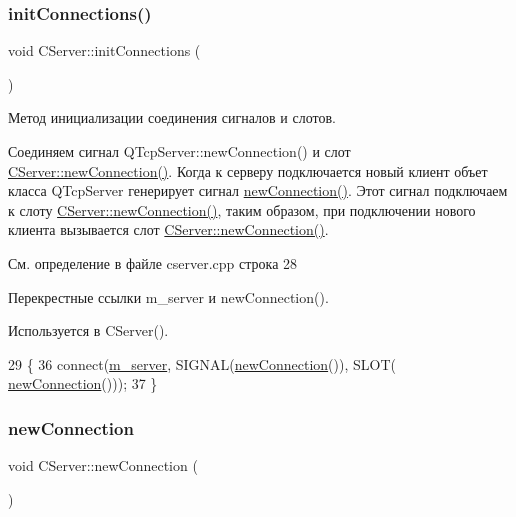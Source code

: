 \subsubsection{\texorpdfstring{init\+Connections()}{initConnections()}}
{\footnotesize\ttfamily void C\+Server\+::init\+Connections (\begin{DoxyParamCaption}{ }\end{DoxyParamCaption})}



Метод инициализации соединения сигналов и слотов. 

Соединяем сигнал Q\+Tcp\+Server\+::new\+Connection() и слот \hyperlink{class_c_server_a4e5b127e1eb4342a130018d9ff921735}{C\+Server\+::new\+Connection()}. Когда к серверу подключается новый клиент объет класса Q\+Tcp\+Server генерирует сигнал \hyperlink{class_c_server_a4e5b127e1eb4342a130018d9ff921735}{new\+Connection()}. Этот сигнал подключаем к слоту \hyperlink{class_c_server_a4e5b127e1eb4342a130018d9ff921735}{C\+Server\+::new\+Connection()}, таким образом, при подключении нового клиента вызывается слот \hyperlink{class_c_server_a4e5b127e1eb4342a130018d9ff921735}{C\+Server\+::new\+Connection()}.

См. определение в файле cserver.\+cpp строка 28



Перекрестные ссылки m\+\_\+server и new\+Connection().



Используется в C\+Server().


\begin{DoxyCode}
29 \{
36     connect(\hyperlink{class_c_server_a0ee5b734ddfc86fc181e767700f7a46b}{m\_server}, SIGNAL(\hyperlink{class_c_server_a4e5b127e1eb4342a130018d9ff921735}{newConnection}()), SLOT(
      \hyperlink{class_c_server_a4e5b127e1eb4342a130018d9ff921735}{newConnection}()));
37 \}
\end{DoxyCode}
\hypertarget{class_c_server_a4e5b127e1eb4342a130018d9ff921735}{}\label{class_c_server_a4e5b127e1eb4342a130018d9ff921735} 
\subsubsection{\texorpdfstring{new\+Connection}{newConnection}}
{\footnotesize\ttfamily void C\+Server\+::new\+Connection (\begin{DoxyParamCaption}{ }\end{DoxyParamCaption})\hspace{0.3cm}{\ttfamily [slot]}}



